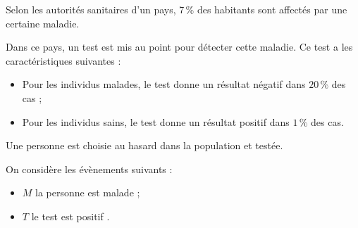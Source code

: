 \medskip

Selon les autorités sanitaires d'un pays, 7\,\% des habitants sont affectés par une certaine maladie.

Dans ce pays, un test est mis au point pour détecter cette maladie. Ce test a les caractéristiques suivantes :
\setlength\parindent{1cm}
\begin{itemize}
\item[$\bullet~~$] Pour les individus malades, le test donne un résultat négatif dans $20 \,\%$ des cas ;
\item[$\bullet~~$] Pour les individus sains, le test donne un résultat positif dans $1\,\%$ des cas.
\end{itemize}
\setlength\parindent{0cm}

Une personne est choisie au hasard dans la population et testée.

On considère les évènements suivants :

\setlength\parindent{1cm}
\begin{itemize}
\item[$\bullet~~$] $M$ \og la personne est malade \fg{} ;
\item[$\bullet~~$]  $T$ \og le test est positif \fg{}.
\end{itemize}
\setlength\parindent{0cm}

\medskip

